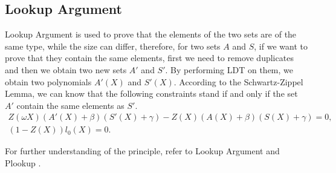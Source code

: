\subsection{Lookup Argument}

Lookup Argument is used to prove that the elements of the two sets are of the same type, while the size can differ, therefore, for two sets $A$ and $S$, if we want to prove that they contain the same elements, first we need to remove duplicates and then we obtain two new sets $A'$ and $S'$. By performing LDT on them, we obtain two polynomials $A'(X)$ and $S'(X)$. According to the Schwartz-Zippel Lemma, we can know that the following constraints stand if and only if the set $A'$ contain the same elements as $S'$.
\begin{align*}
    Z(\omega X)(A'(X)+\beta)(S'(X)+\gamma) - Z(X)(A(X)+\beta)(S(X)+\gamma) = 0, \\
    (1-Z(X))l_0(X) = 0.
\end{align*}

For further understanding of the principle, refer to Lookup Argument \cite{website:lookup-argument} and Plookup \cite{cryptoeprint:2020/315}.
